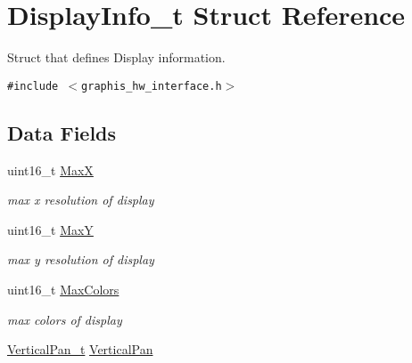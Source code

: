 \hypertarget{struct_display_info__t}{
\section{DisplayInfo\_\-t Struct Reference}
\label{struct_display_info__t}
}
Struct that defines Display information.  


{\tt \#include $<$graphis\_\-hw\_\-interface.h$>$}

\subsection*{Data Fields}
\begin{CompactItemize}
\item 
\hypertarget{struct_display_info__t_8053732e387e0cd80737d0e2f81f867f}{
uint16\_\-t \hyperlink{struct_display_info__t_8053732e387e0cd80737d0e2f81f867f}{MaxX}}
\label{struct_display_info__t_8053732e387e0cd80737d0e2f81f867f}

\begin{CompactList}\small\item\em max x resolution of display \item\end{CompactList}\item 
\hypertarget{struct_display_info__t_a2a6c390b0bbc046bde38222c450c5e7}{
uint16\_\-t \hyperlink{struct_display_info__t_a2a6c390b0bbc046bde38222c450c5e7}{MaxY}}
\label{struct_display_info__t_a2a6c390b0bbc046bde38222c450c5e7}

\begin{CompactList}\small\item\em max y resolution of display \item\end{CompactList}\item 
\hypertarget{struct_display_info__t_73daf7aa7537e951b15d59e18ee9fb0d}{
uint16\_\-t \hyperlink{struct_display_info__t_73daf7aa7537e951b15d59e18ee9fb0d}{MaxColors}}
\label{struct_display_info__t_73daf7aa7537e951b15d59e18ee9fb0d}

\begin{CompactList}\small\item\em max colors of display \item\end{CompactList}\item 
\hypertarget{struct_display_info__t_b3c774c5fb902d452ea7b8261c3f005c}{
\hyperlink{group__graphic__hw__interface_g18b37a90b4b77654c4a5f7613868d4aa}{VerticalPan\_\-t} \hyperlink{struct_display_info__t_b3c774c5fb902d452ea7b8261c3f005c}{VerticalPan}}
\label{struct_display_info__t_b3c774c5fb902d452ea7b8261c3f005c}


\end{CompactItemize}
